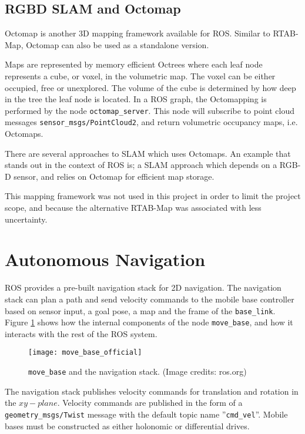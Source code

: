 \subsection{RGBD SLAM and Octomap}

Octomap\cite{hornung13auro} is another 3D mapping framework available for \ac{ROS}. Similar to \ac{RTAB-Map}, Octomap can also be used as a standalone version. 

Maps are represented by memory efficient Octrees where each leaf node represents a cube, or voxel, in the volumetric map. The voxel can be either occupied, free or unexplored. The volume of the cube is determined by how deep in the tree the leaf node is located. In a \ac{ROS} graph, the Octomapping is performed by the node \texttt{octomap\_server}. This node  will subscribe to point cloud messages \texttt{sensor\_msgs/PointCloud2}, and return volumetric occupancy maps, i.e. Octomaps.

There are several approaches to \ac{SLAM}  which uses Octomaps. An example that stands out in the context of \ac{ROS} is\cite{endres20143}; a \ac{SLAM} approach which depends on a RGB-D sensor, and relies on Octomap for efficient map storage.

This mapping framework was not used in this project in order to limit the project scope, and because the alternative \ac{RTAB-Map} was associated with less uncertainty.

\section{Autonomous Navigation}
\label{sec:navigation_theory}
\ac{ROS} provides a pre-built navigation stack for 2D navigation. The navigation stack can plan a path and send velocity commands to the mobile base controller based on sensor input, a goal pose, a map and the frame of the \texttt{base\_link}. Figure \ref{fig:move_base_official} shows how the internal components of the node \texttt{move\_base}, and how it interacts with the rest of the \ac{ROS} system. 

\begin{figure}[h]
    \centering
    \texttt{[image: move\_base\_official]}
    \caption{\texttt{move\_base} and the navigation stack. (Image credits:  ros.org)}
    \label{fig:move_base_official}
\end{figure}

The navigation stack publishes velocity commands for translation and rotation in the $xy-plane$. Velocity commands are published in the form of a \texttt{geometry\_msgs/Twist} message with the default topic name ''\texttt{cmd\_vel}''. Mobile bases must be constructed as either holonomic or differential drives.

